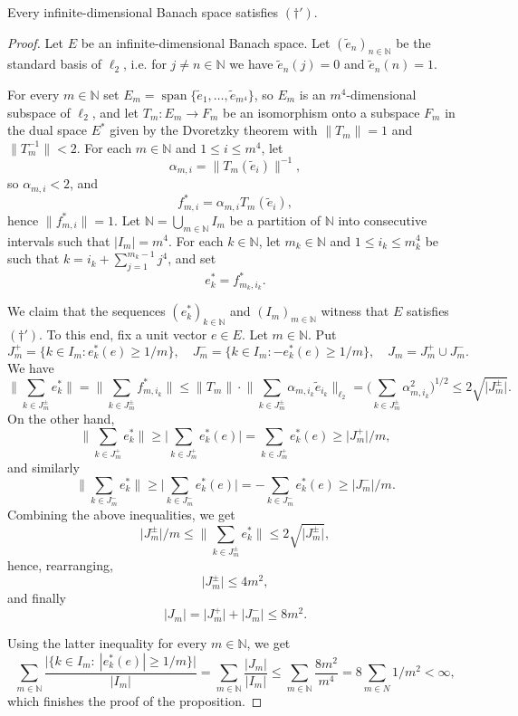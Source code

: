 \documentclass[10pt,a4paper]{amsart}
\DeclareMathOperator{\spn}{span}
\newcommand{\N}{\mathbb{N}}
\begin{document}
\begin{proposition}\label{prop:daggerprim}
    Every infinite-dimensional Banach space satisfies $(\dagger')$.
\end{proposition}

\begin{proof}
    Let $E$ be an infinite-dimensional Banach space. Let $(\tilde{e}_n)_{n\in\N}$ be the standard basis of $\ell_2$, i.e. for $j\neq n\in\N$ we have $\tilde{e}_n(j)=0$ and $\tilde{e}_n(n)=1$.
    
    For every $m\in\N$ set $E_m=\spn\big\{\tilde{e}_1,\ldots,\tilde{e}_{m^4}\big\}$, so $E_m$ is an $m^4$-dimensional subspace of $\ell_2$, and let $T_m\colon E_m\to F_m$ be an isomorphism onto a subspace $F_m$ in the dual space $E^*$ given by the Dvoretzky theorem with $\|T_m\|=1$ and $\big\|T_m^{-1}\big\|<2$. For each $m\in\N$ and $1\le i\le m^4$, let 
    \[\alpha_{m,i}=\big\|T_m(\tilde{e}_i)\big\|^{-1},\]
    so $\alpha_{m,i}<2$, and
    \[f_{m,i}^*=\alpha_{m,i}T_m(\tilde{e}_i),\]
    hence $\big\|f_{m,i}^*\big\|=1$. Let $\N=\bigcup_{m\in\N}I_m$ be a partition of $\N$ into consecutive intervals such that $|I_m|=m^4$. For each $k\in\N$, let $m_k\in\N$ and $1\le i_k\le m_k^4$ be such that $k=i_k+\sum_{j=1}^{m_k-1}j^4$, and set 
    \[e_k^*=f_{m_k,i_k}^*.\]

    We claim that the sequences $(e_k^*)_{k\in\N}$ and $(I_m)_{m\in\N}$ witness that $E$ satisfies $(\dagger')$. To this end, fix a unit vector $e\in E$. Let $m\in\N$. Put
    \[J_m^+=\big\{k\in I_m\colon e_k^*(e)\ge1/m\big\},\quad J_m^-=\big\{k\in I_m\colon -e_k^*(e)\ge1/m\big\},\quad J_m=J_m^+\cup J_m^-.\]
    We have
    \[\bigg\|\sum_{k\in J_m^{\pm}}e_k^*\bigg\|=\bigg\|\sum_{k\in J_m^{\pm}}f_{m,i_k}^*\bigg\|\le\|T_m\|\cdot\bigg\|\sum_{k\in J_m^{\pm}}\alpha_{m,i_k}\tilde{e}_{i_k}\bigg\|_{\ell_2}=\bigg(\sum_{k\in J_m^{\pm}}\alpha_{m,i_k}^2\bigg)^{1/2}\le2\sqrt{\big|J_m^{\pm}\big|}.\]
    On the other hand,
    \[\bigg\|\sum_{k\in J_m^+}e_k^*\bigg\|\ge\bigg|\sum_{k\in J_m^+}e_k^*(e)\bigg|=\sum_{k\in J_m^+}e_k^*(e)\ge\big|J_m^+\big|/m,\]
    and similarly
    \[\bigg\|\sum_{k\in J_m^-}e_k^*\bigg\|\ge\bigg|\sum_{k\in J_m^-}e_k^*(e)\bigg|=-\sum_{k\in J_m^-}e_k^*(e)\ge\big|J_m^-\big|/m.\]
    Combining the above inequalities, we get
     \[\big|J_m^{\pm}\big|/m\le\bigg\|\sum_{k\in J_m^{\pm}}e_k^*\bigg\|\le2\sqrt{\big|J_m^{\pm}\big|},\]%
     hence, rearranging,
     \[\big|J_m^{\pm}\big|\le4m^2,\]%
     and finally
     \[|J_m|=\big|J_m^+\big|+\big|J_m^-\big|\le8m^2.\]

     Using the latter inequality for every $m\in\N$, we get
     \[\sum_{m\in\N}\frac{\big|\big\{k\in I_m\colon\ |e_k^*(e)|\ge1/m\big\}\big|}{|I_m|}=\sum_{m\in\N}\frac{|J_m|}{|I_m|}\le\sum_{m\in\N}\frac{8m^2}{m^4}=8\sum_{m\in N}1/m^2<\infty,\]
     which finishes the proof of the proposition.
\end{proof}
\end{document}
